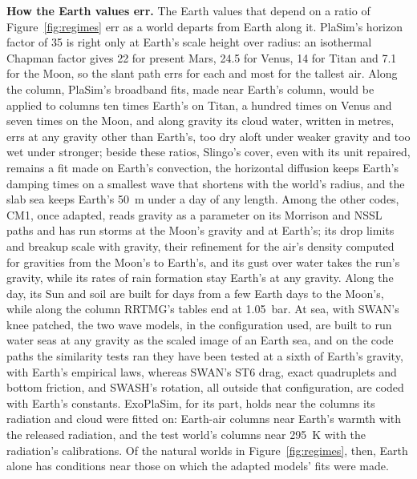 \textbf{How the Earth values err.} The Earth values that depend on a ratio of Figure~\ref{fig:regimes} err as a
world departs from Earth along it. PlaSim's horizon factor of 35 is right only at Earth's scale height over radius:
an isothermal Chapman factor gives 22 for present Mars, 24.5 for Venus, 14 for Titan and 7.1 for the Moon, so the
slant path errs for each and most for the tallest air. Along the column, PlaSim's broadband fits, made near Earth's
column, would be applied to columns ten times Earth's on Titan, a hundred times on Venus and seven times on the
Moon, and along gravity its cloud water, written in metres, errs at any gravity other than Earth's, too dry aloft
under weaker gravity and too wet under stronger; beside these ratios, Slingo's cover, even with its unit repaired,
remains a fit made on Earth's convection, the horizontal diffusion keeps Earth's damping times on a smallest wave
that shortens with the world's radius, and the slab sea keeps Earth's 50~m under a day of any
length. Among the other codes, CM1, once adapted, reads gravity as a
parameter on its Morrison and NSSL paths and has run storms at
the Moon's gravity and at Earth's; its drop limits and breakup scale with gravity, their refinement for the air's density computed for
gravities from the Moon's to Earth's, and its gust over water takes the run's gravity, while its rates of rain
formation stay Earth's at any gravity. Along the day, its Sun and soil are built for
days from a few Earth days to the Moon's, while along the column RRTMG's tables end at 1.05~bar. At sea, with
SWAN's knee patched, the two wave models, in the configuration used, are built to run water seas at any gravity as
the scaled image of an Earth sea, and on the code paths the similarity tests ran they have been tested at a sixth
of Earth's gravity, with Earth's empirical laws, whereas SWAN's ST6 drag, exact quadruplets and bottom friction,
and SWASH's rotation, all outside that configuration, are coded with Earth's constants. ExoPlaSim, for its part, holds near
the columns its radiation and cloud were fitted on: Earth-air columns near Earth's warmth with the released
radiation, and the test world's columns near 295~K with the radiation's calibrations. Of the natural worlds in
Figure~\ref{fig:regimes}, then, Earth alone has conditions near those on which the adapted models' fits were made.

